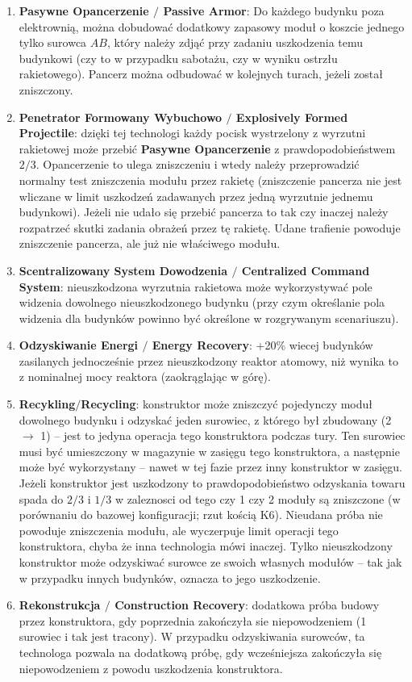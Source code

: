 \documentclass[11pt,a4paper]{article}
\begin{document}
\begin{enumerate}
\item \textbf{Pasywne Opancerzenie $/$ Passive Armor}: Do każdego budynku poza elektrownią, można dobudować dodatkowy zapasowy moduł o koszcie jednego tylko surowca $AB$, który należy zdjąć przy zadaniu uszkodzenia temu budynkowi (czy to w przypadku sabotażu, czy w wyniku ostrzłu rakietowego). Pancerz można odbudować w kolejnych turach, jeżeli został zniszczony.
\item \textbf{Penetrator Formowany Wybuchowo $/$ Explosively Formed Projectile}: dzięki tej technologi każdy pocisk wystrzelony z wyrzutni rakietowej może przebić \textbf{Pasywne Opancerzenie} z prawdopodobieństwem $2/3$. Opancerzenie to ulega zniszczeniu i wtedy należy przeprowadzić normalny test zniszczenia modułu przez rakietę (zniszczenie pancerza nie jest wliczane w limit uszkodzeń zadawanych przez jedną wyrzutnie jednemu budynkowi). Jeżeli nie udało się przebić pancerza to tak czy inaczej należy rozpatrzeć skutki zadania obrażeń przez tę rakietę. Udane trafienie powoduje zniszczenie pancerza, ale już nie właściwego modułu.
\item \textbf{Scentralizowany System Dowodzenia $/$ Centralized Command System}: nieuszkodzona wyrzutnia rakietowa może wykorzystywać pole widzenia dowolnego nieuszkodzonego budynku (przy czym określanie pola widzenia dla budynków powinno być określone w rozgrywanym scenariuszu).
\item \textbf{Odzyskiwanie Energi $/$ Energy Recovery}: +20\% wiecej budynków zasilanych jednocześnie przez nieuszkodzony reaktor atomowy, niż wynika to z nominalnej mocy reaktora (zaokrąglając w górę).
\item \textbf{Recykling$/$Recycling}: konstruktor może zniszczyć pojedynczy moduł dowolnego budynku i odzyskać jeden surowiec, z którego był zbudowany (2 $\to$ 1) -- jest to jedyna operacja tego konstruktora podczas tury. Ten surowiec musi być umieszczony w magazynie w zasięgu tego konstruktora, a następnie może być wykorzystany -- nawet w tej fazie przez inny konstruktor w zasięgu. Jeżeli konstruktor jest uszkodzony to prawdopodobieństwo odzyskania towaru spada do $2/3$ i $1/3$ w zaleznosci od tego czy 1 czy 2 moduły są zniszczone (w porównaniu do bazowej konfiguracji; rzut kością K6). Nieudana próba nie powoduje zniszczenia modułu, ale wyczerpuje limit operacji tego konstruktora, chyba że inna technologia mówi inaczej. Tylko nieuszkodzony konstruktor może odzyskiwać surowce ze swoich własnych modułów -- tak jak w przypadku innych budynków, oznacza to jego uszkodzenie.
\item \textbf{Rekonstrukcja $/$ Construction Recovery}: dodatkowa próba budowy przez konstruktora, gdy poprzednia zakończyła sie niepowodzeniem (1 surowiec i tak jest tracony). W przypadku odzyskiwania surowców, ta technologa pozwala na dodatkową próbę, gdy wcześniejsza zakończyła się niepowodzeniem z powodu uszkodzenia konstruktora.

\end{enumerate}
\end{document}

